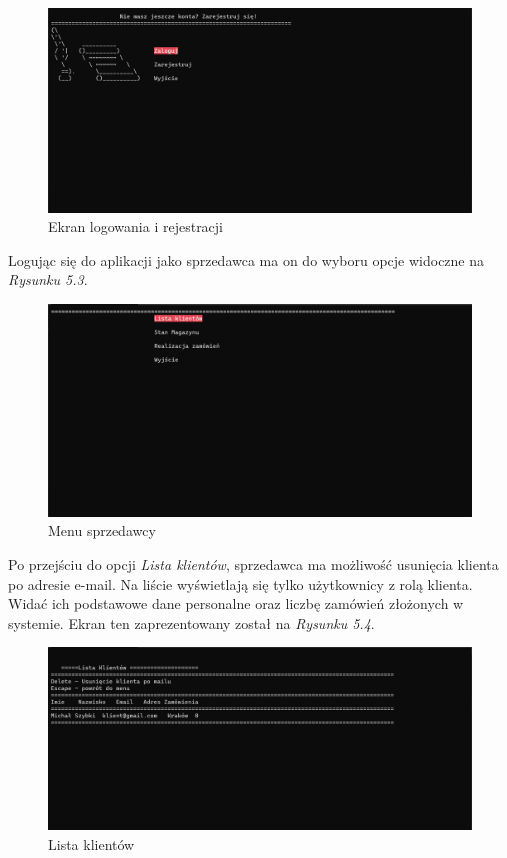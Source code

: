 \begin{figure}[H]
    \centering
		\includegraphics[width=15cm]{screeny/logowanie_sprzedawca.png}
	\caption{\footnotesize Ekran logowania i rejestracji}
	\label{fig:plotend}
\end{figure}

Logując się do aplikacji jako sprzedawca ma on do wyboru opcje widoczne na \textit{Rysunku 5.3}.

\begin{figure}[H]
	\centering
		\includegraphics[width=15cm]{screeny/sprzedawca_menu.png}
	\caption{\footnotesize Menu sprzedawcy}
	\label{fig:plotend}
\end{figure}

Po przejściu do opcji \textit{Lista klientów}, sprzedawca ma możliwość usunięcia klienta po adresie e-mail. Na liście wyświetlają się tylko użytkownicy z rolą klienta. Widać ich podstawowe dane personalne oraz liczbę zamówień złożonych w systemie. Ekran ten zaprezentowany został na \textit{Rysunku 5.4}.

\begin{figure}[H]
	\centering
		\includegraphics[width=15cm]{screeny/lista_klientow.png}
	\caption{\footnotesize Lista klientów}
	\label{fig:plotend}
\end{figure}


